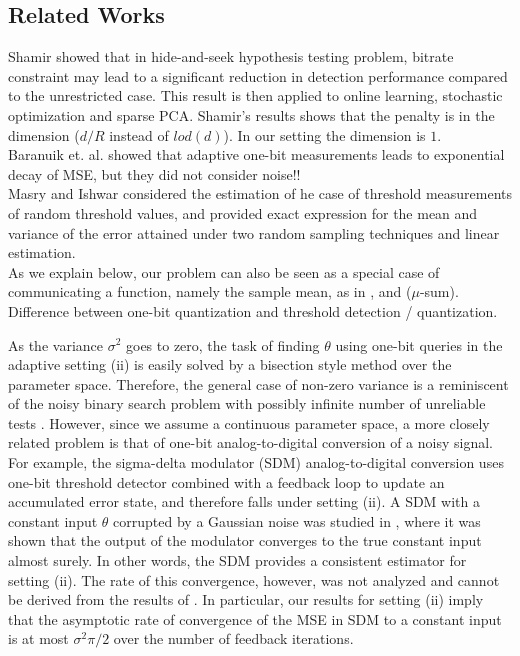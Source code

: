 \documentclass[letterpaper, conference]{IEEEtran}      %
\begin{document}
\subsection*{Related Works}
{\color{red} Shamir \cite{Shamir} showed that in hide-and-seek hypothesis testing problem, bitrate constraint may lead to a significant reduction in detection performance compared to the unrestricted case. This result is then applied to online learning, stochastic optimization and sparse PCA. Shamir's results shows that the penalty is in the dimension ($d/R$ instead of $lod(d)$). In our setting the dimension is $1$. \\
Baranuik et. al. \cite{baraniuk2017exponential} showed that adaptive one-bit measurements leads to exponential decay of MSE, but they did not consider noise!! \\
Masry and Ishwar 
\cite{masry2009field} considered the estimation of 
he case of threshold measurements of random threshold values, and provided exact expression for the mean and variance of the
error attained under two random sampling techniques and linear estimation. \\
As we explain below, our problem can also be seen as a special case of communicating a function, namely the sample mean, as in \cite{1413468}, and ($\mu$-sum).
Difference between one-bit quantization and threshold detection / quantization. 
} 



As the variance $\sigma^2$ goes to zero, the task of finding $\theta$ using one-bit queries in the adaptive setting (ii) is easily solved by a bisection style method over the parameter space. Therefore, the general case of non-zero variance is a reminiscent of the noisy binary search problem with possibly infinite number of unreliable tests \cite{cicalese2002least, Karp:2007:NBS:1283383.1283478}. However, since we assume a continuous parameter space, a more closely related problem is that of one-bit analog-to-digital conversion of a noisy signal. For example, the sigma-delta modulator (SDM) analog-to-digital conversion \cite{1092194} uses one-bit threshold detector combined with a feedback loop to update an accumulated error state, and therefore falls under setting (ii). A SDM with a constant input $\theta$ corrupted by a Gaussian noise was studied in \cite{53738}, where it was shown that the output of the modulator converges to the true constant input almost surely. In other words, the SDM provides a consistent estimator for setting (ii). The rate of this convergence, however, was not analyzed and cannot be derived from the results of \cite{53738}. In particular, our results for setting (ii) imply that the asymptotic rate of convergence of the MSE in SDM to a constant input is at most $\sigma^2\pi/2$ over the number of feedback iterations. \\
\end{document}
